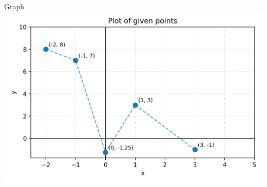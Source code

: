 \documentclass{beamer}
\begin{document}
\begin{frame}{Graph}
    \centering
    \includegraphics[width=\columnwidth, height=0.8\textheight, keepaspectratio]{figs/fig1.png}     
\end{frame}
\end{document}
